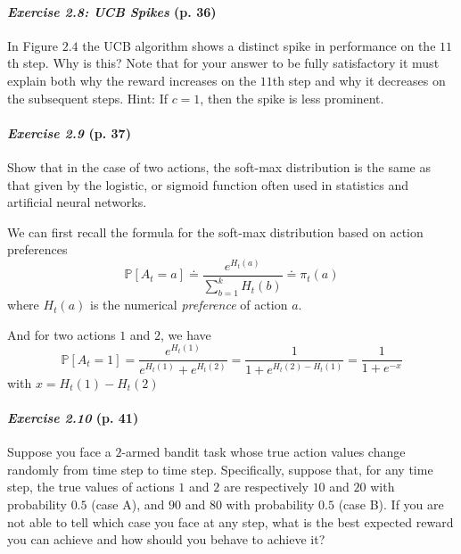 \documentclass[10pt,a4paper]{article}
\begin{document}


\paragraph{\textit{Exercise 2.8: UCB Spikes} (p. 36)} In Figure $2.4$ the UCB algorithm shows a distinct spike
in performance on the $11$th step. Why is this? Note that for your answer to be fully satisfactory it must explain both why the reward increases on the $11$th step and why it decreases on the subsequent steps. Hint: If $c = 1$, then the spike is less prominent.

\paragraph{\textit{Exercise 2.9} (p. 37)} Show that in the case of two actions, the soft-max distribution is the same
as that given by the logistic, or sigmoid function often used in statistics and artificial
neural networks.

\bigskip
We can first recall the formula for the soft-max distribution based on action preferences
\begin{equation}
\mathbb{P}[A_t = a] \doteq \frac{e^{H_t(a)}}{\sum_{b=1}^k H_t(b)} \doteq \pi_t(a)
\end{equation}
where $H_t(a)$ is the numerical \textit{preference} of action $a$.

And for two actions $1$ and $2$, we have
\begin{equation}
\mathbb{P}[A_t = 1] = \frac{e^{H_t(1)}}{ e^{H_t(1)} + e^{H_t(2)}} = \frac{1}{1 +  e^{H_t(2) -  H_t(1)}} = \frac{1}{1 +  e^{-x}}
\end{equation}
with $x = H_t(1)- H_t(2)$

\paragraph{\textit{Exercise 2.10} (p. 41)} Suppose you face a $2$-armed bandit task whose true action values change randomly from time step to time step. Specifically, suppose that, for any time step, the true values of actions $1$ and $2$ are respectively $10$ and $20$ with probability $0.5$ (case
A), and $90$ and $80$ with probability $0.5$ (case B). If you are not able to tell which case you face at any step, what is the best expected reward you can achieve and how should you behave to achieve it?
\end{document}
